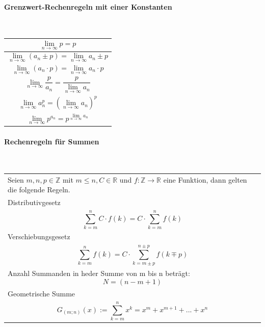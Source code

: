 \paragraph{Grenzwert-Rechenregeln mit einer Konstanten}\mbox{}\\
\noindent
\begin{tabularx}{\columnwidth}{@{}X@{}}
    \hline
    \[ \lim_{n \to \infty} p = p \] \\ \hline
    \[ \lim_{n \to \infty} (a_n \pm p ) = \lim_{n \to \infty} a_n \pm p \] \\ \hline
    \[ \lim_{n \to \infty} (a_n \cdot p ) = \lim_{n \to \infty} a_n\cdot p \] \\ \hline
    \[ \lim_{n \to \infty} \frac{p}{a_n} = \frac{p}{\lim_{n \to \infty} a_n} \] \\ \hline
    \[ \lim_{n \to \infty} a_n^p = (\lim_{n \to \infty} a_n)^p \] \\ \hline
    \[ \lim_{n \to \infty} p^{a_n} = p^{\lim_{n \to \infty} a_n} \] \\ \hline
\end{tabularx}
\vspace{1mm}

\paragraph{Rechenregeln für Summen}\mbox{}\\
\noindent
\begin{tabularx}{\columnwidth}{@{}X@{}}
    \hline
    Seien $m,n,p \in \mathbb{Z}$ mit $m\leq n,C \in \mathbb{R}$ und $f: \mathbb{Z} \to \mathbb{R}$ eine Funktion, dann gelten die folgende Regeln.  \\
    Distributivgesetz \\
    \[ \sum_{k=m}^n C \cdot f(k) = C \cdot \sum_{k=m}^n f(k) \] \\ \hline
    Verschiebungsgesetz \\
    \[ \sum_{k=m}^n f(k) = C \cdot \sum_{k=m\pm p}^{n\pm p} f(k\mp p) \] \\ \hline
    Anzahl Summanden in heder Summe von m bis n beträgt:
    \[ N = (n - m + 1) \] \\ \hline
    Geometrische Summe \\
    \[ G_{(m;n)}(x) := \sum_{k=m}^n x^k = x^m + x^{m+1} + ... + x^n \] \\ \hline
\end{tabularx}
\vspace{1mm}

